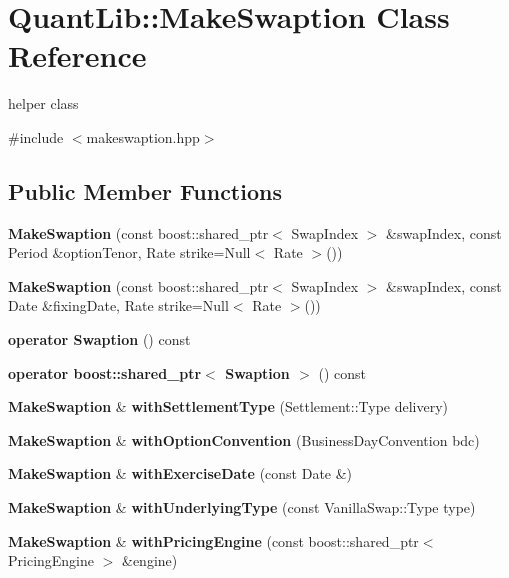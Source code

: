 \section{Quant\+Lib\+:\+:Make\+Swaption Class Reference}
\label{class_quant_lib_1_1_make_swaption}


helper class  




{\ttfamily \#include $<$makeswaption.\+hpp$>$}

\subsection*{Public Member Functions}
\begin{DoxyCompactItemize}
\item 
{\bfseries Make\+Swaption} (const boost\+::shared\+\_\+ptr$<$ Swap\+Index $>$ \&swap\+Index, const Period \&option\+Tenor, Rate strike=Null$<$ Rate $>$())\label{class_quant_lib_1_1_make_swaption_aef4d2a8fcdfd2343b347a9b461f20899}

\item 
{\bfseries Make\+Swaption} (const boost\+::shared\+\_\+ptr$<$ Swap\+Index $>$ \&swap\+Index, const Date \&fixing\+Date, Rate strike=Null$<$ Rate $>$())\label{class_quant_lib_1_1_make_swaption_afa4c97e5b5c51425142b1e8499a4aced}

\item 
{\bfseries operator Swaption} () const \label{class_quant_lib_1_1_make_swaption_ac244e8913a4c707c6ed21b3dfbebf8b6}

\item 
{\bfseries operator boost\+::shared\+\_\+ptr$<$ Swaption $>$} () const \label{class_quant_lib_1_1_make_swaption_a59d9a72519ec68f0d4265f6c0cc94119}

\item 
{\bf Make\+Swaption} \& {\bfseries with\+Settlement\+Type} (Settlement\+::\+Type delivery)\label{class_quant_lib_1_1_make_swaption_a64c747cc3ea417836c89a3e50a52a992}

\item 
{\bf Make\+Swaption} \& {\bfseries with\+Option\+Convention} (Business\+Day\+Convention bdc)\label{class_quant_lib_1_1_make_swaption_af0c1f416a65d5bb6f5dd9761f906f20c}

\item 
{\bf Make\+Swaption} \& {\bfseries with\+Exercise\+Date} (const Date \&)\label{class_quant_lib_1_1_make_swaption_a48312bca2d089069b74da67f6219a708}

\item 
{\bf Make\+Swaption} \& {\bfseries with\+Underlying\+Type} (const Vanilla\+Swap\+::\+Type type)\label{class_quant_lib_1_1_make_swaption_af64b601313f365a5145eef73d4bd14ce}

\item 
{\bf Make\+Swaption} \& {\bfseries with\+Pricing\+Engine} (const boost\+::shared\+\_\+ptr$<$ Pricing\+Engine $>$ \&engine)\label{class_quant_lib_1_1_make_swaption_a0b9d0082486cc59bb1400bb63c4cee94}

\end{DoxyCompactItemize}


